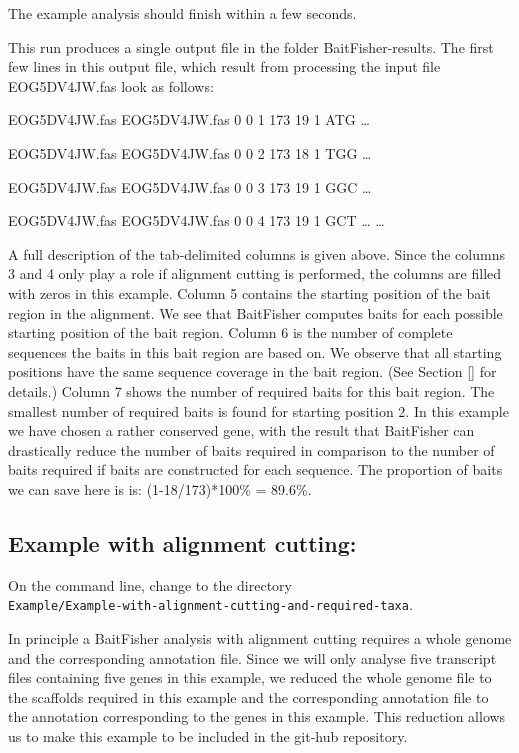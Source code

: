 \documentclass[a4paper,pdflatex,11pt]{article}
\begin{document}
The example analysis should finish within a few seconds.

This run produces a single output file in the folder BaitFisher-results.
The first few lines in this output file, which result from processing the input file
EOG5DV4JW.fas look as follows:

EOG5DV4JW.fas EOG5DV4JW.fas 0 0 1 173 19 1 ATG \dots

EOG5DV4JW.fas EOG5DV4JW.fas 0 0 2 173 18 1 TGG \dots

EOG5DV4JW.fas EOG5DV4JW.fas 0 0 3 173 19 1 GGC \dots

EOG5DV4JW.fas EOG5DV4JW.fas 0 0 4 173 19 1 GCT \dots
\ldots

A full description of the tab-delimited columns is given above. Since
the columns 3 and 4 only play a role if alignment cutting is performed,
the columns are filled with zeros in this example. Column 5 contains the
starting position of the bait region in the alignment. We see that
BaitFisher computes baits for each possible starting position of the bait region.
Column 6 is the number of complete sequences the baits in this bait region are based on.
We observe that all starting positions have the same sequence coverage in the bait
region. (See Section \ref{} for details.)    %
Column 7 shows the number of required baits for this bait
region. The smallest number of required baits is found for starting position 2.
In this example we have chosen a rather conserved gene, with the
result that BaitFisher can drastically reduce the number of baits
required in comparison to the number of baits required if baits are
constructed for each sequence. The proportion of baits we can save here
is is: (1-18/173)*100\% = 89.6\%.

\subsection{Example with alignment cutting:}

\label{label_Example_alignment_cutting}

On the command line, change to the directory\\
\verb+Example/Example-with-alignment-cutting-and-required-taxa+.

In principle a BaitFisher analysis with alignment cutting requires a whole genome and the corresponding annotation file.
Since we will only analyse five transcript files containing five genes in this example, we 
reduced the whole genome file to the scaffolds required in this example and the corresponding annotation file
to the annotation corresponding to the genes in this example. This reduction allows us to make this example
to be included in the git-hub repository.
\end{document}
